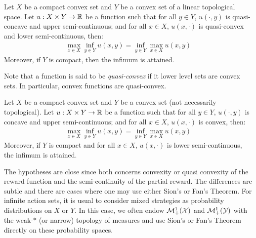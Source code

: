 \begin{thm}
Let $X$ be a compact convex set and $Y$ be a convex set of a linear topological space. Let $u:X\times Y\to\mathbb{R}$ be a function such that for all $y\in Y$, $u(\cdot,y)$ is quasi-concave and upper semi-continuous; and for all $x\in X$, $u(x,\cdot)$ is quasi-convex and lower semi-continuous, then:
\begin{align*}
    \max_{x\in X}\inf_{y\in Y} u(x,y) = \inf_{y\in Y}\max_{x\in X} u(x,y)
\end{align*}
Moreover, if $Y$ is compact, then the infimum is attained.
\end{thm}

Note that a function is said to be \emph{quasi-convex} if it lower level sets are convex sets. In particular, convex functions are quasi-convex. 
\begin{thm}
Let $X$ be a compact convex set and $Y$ be a convex set (not necessarily topological). Let $u:X\times Y\to\mathbb{R}$ be a function such that for all $y\in Y$, $u(\cdot,y)$ is concave and upper semi-continuous; and for all $x\in X$, $u(x,\cdot)$ is convex, then:
\begin{align*}
    \max_{x\in X}\inf_{y\in Y} u(x,y) = \inf_{y\in Y}\max_{x\in X} u(x,y)
\end{align*}
Moreover, if $Y$ is compact and for all $x\in X$, $u(x,\cdot)$ is lower semi-continuous, the infimum is attained.
\end{thm}

The hypotheses are close since both concerns convexity or quasi convexity of the reward function and the semi-continuity of the partial reward. The differences are subtle and there are cases where one may use either Sion's or Fan's Theorem. For infinite action sets, it is usual to consider mixed strategies as probability distributions on $X$ or $Y$. In this case, we often endow $\mathcal{M}^1_+(\mathcal{X})$ and $\mathcal{M}^1_+(\mathcal{Y})$ with the weak-$*$ (or narrow) topology of measures and use Sion's or Fan's Theorem directly on these probability spaces.




